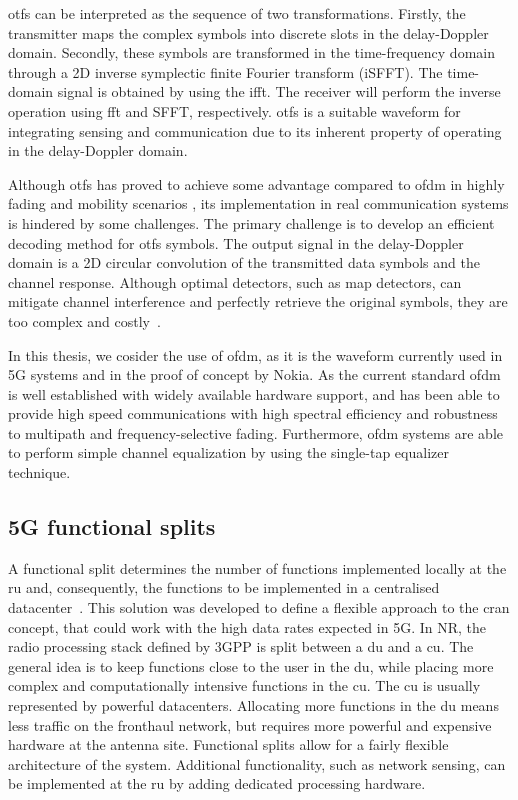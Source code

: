 	\gls{otfs} can be interpreted as the sequence of two transformations. 
	Firstly, the transmitter maps the complex symbols into discrete slots in the delay-Doppler domain.
	Secondly, these symbols are transformed in the time-frequency domain through a 2D inverse symplectic finite Fourier transform (iSFFT). The time-domain signal is obtained by using the \gls{ifft}. 
	The receiver will perform the inverse operation using \gls{fft} and SFFT, respectively.
	\gls{otfs} is a suitable waveform for integrating sensing and communication due to its inherent property of operating in the delay-Doppler domain.
	
	Although \gls{otfs} has proved to achieve some advantage compared to \gls{ofdm} in highly fading and mobility scenarios \cite{OTFS_Hadani_2017}, its implementation in real communication systems is hindered by some challenges. 
	The primary challenge is to develop an efficient decoding method for \gls{otfs} symbols.
	The output signal in the delay-Doppler domain is a 2D circular convolution of the transmitted data symbols and the channel response. Although optimal detectors, such as \gls{map} detectors, can mitigate channel interference and perfectly retrieve the original symbols, they are too complex and costly~\cite{Raviteja_Viterbo_OTFS_decoding}.
	
	In this thesis, we cosider the use of \gls{ofdm}, as it is the waveform currently used in 5G systems and in the proof of concept by Nokia. 
	As the current standard \gls{ofdm} is well established with widely available hardware support, and has been able to provide high speed communications with high spectral efficiency and robustness to multipath and frequency-selective fading.
	Furthermore, \gls{ofdm} systems are able to perform simple channel equalization by using the single-tap equalizer technique.
	
	 
	
	\subsection{5G functional splits}
	
	A functional split determines the number of functions implemented locally at the \gls{ru} and, consequently, the functions to be implemented in a centralised datacenter~\cite{Larsen_Checko_Christiansen_2019}. 
 	This solution was developed to define a flexible approach to the \gls{cran} concept, that could work with the high data rates expected in 5G. 
	In \gls{NR}, the radio processing stack defined by \gls{3GPP} is split between a \gls{du} and a \gls{cu}. 
	The general idea is to keep functions close to the user in the \gls{du}, while placing more complex and computationally intensive functions in the \gls{cu}. The \gls{cu} is usually represented by powerful datacenters.
	Allocating more functions in the \gls{du} means less traffic on the fronthaul network, but requires more powerful and expensive hardware at the antenna site.
	Functional splits allow for a fairly flexible architecture of the system. Additional functionality, such as network sensing, can be implemented at the \gls{ru} by adding dedicated processing hardware.

